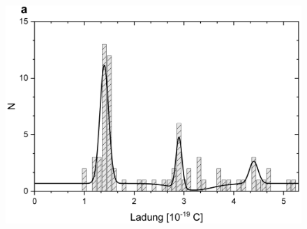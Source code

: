 \documentclass[a4paper,usenatbib]{aspdoc}
\begin{document}
            \begin{figure}
                \centering
                \includegraphics[width=120mm]{graphs/chargeOcc1.png}
                
                \vspace{0.3cm}
                

\end{figure}
\end{document}
